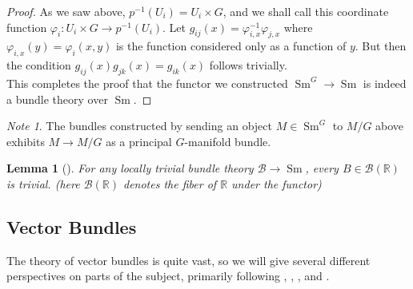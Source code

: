 \documentclass[reqno]{amsart}
\newtheorem{lemma}[theorem]{Lemma}
\theoremstyle{definition}
\theoremstyle{remark}
\newtheorem*{note}{Note}
\DeclareMathOperator{\Sm}{Sm}
\begin{document}
\begin{proof}
        As we saw above,
        $p^{-1}\left( U_i \right) 
        = U_i \times G $, and we shall call this
        coordinate function $\varphi_i \colon
        U_i \times G \to p^{-1}(U_i)$.
        Let $g_{ij} (x) = 
        \varphi_{i,x}^{-1} \varphi_{j,x}$ where
        $\varphi_{i,x}(y) = \varphi_{i}(x,y)$ is the function
        considered only as a function of $y$. But then
        the condition
        $g_{ij}(x)  g_{jk}(x) = g_{ik}(x)$ follows
        trivially.\\
        \linebreak
        This completes the proof that the functor
        we constructed $\Sm^{G}\to \Sm$ is indeed
        a bundle theory over $\Sm$. 
    \end{proof}
        

        \begin{note}
            The bundles constructed by sending
            an object $M \in \Sm^{G}$ to $M /G$ 
            above exhibits $M \to M /G$ as a principal
            $G$-manifold bundle.
        \end{note}

        \begin{lemma}[]
            For any locally trivial bundle theory
            $\mathcal{B} \to \Sm$, 
            every $B \in \mathcal{B}(\mathbb{R})$ is trivial.
            (here $\mathcal{B}(\mathbb{R})$ denotes the
            fiber of $\mathbb{R}$ under the functor)
        \end{lemma}

    \newpage

    \subsection{Vector Bundles}


    The theory of vector bundles is quite vast, so
    we will give several different perspectives on
    parts of the subject, primarily following
    \cite{LeeSM}, \cite{JB}, \cite{BT}, \cite{MS} and
    \cite{Dieck}.
\end{document}
